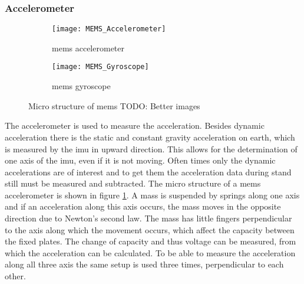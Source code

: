 \subsubsection{ Accelerometer}
\begin{figure}[htb]
	\centering
	\begin{subfigure}{0.48\textwidth}
		\centering
		\texttt{[image: MEMS\_Accelerometer]}
		\caption{\acrshort{mems} accelerometer}
		\label{fig:MEMS_Accelerometer}
	\end{subfigure}
	\begin{subfigure}{0.48\textwidth}
		\centering
		\texttt{[image: MEMS\_Gyroscope]}
		\caption{\acrshort{mems} gyroscope}
		\label{fig:MEMS_Gyroscope}
	\end{subfigure}
	\caption{Micro structure of \acrshort{mems} TODO: Better images}
	\label{fig:MEMS_design}
\end{figure}
The accelerometer is used to measure the acceleration.
Besides dynamic acceleration there is the static and constant gravity acceleration on earth, which is measured by the \gls{imu} in upward direction.
This allows for the determination of one axis of the \gls{imu}, even if it is not moving.
Often times only the dynamic accelerations are of interest and to get them the acceleration data during stand still must be measured and subtracted.
The micro structure of a \gls{mems} accelerometer is shown in figure \ref{fig:MEMS_Accelerometer}.
A mass is suspended by springs along one axis and if an acceleration along this axis occurs, the mass moves in the opposite direction due to Newton's second law.
The mass has little fingers perpendicular to the axis along which the movement occurs, which affect the capacity between the fixed plates.
The change of capacity and thus voltage can be measured, from which the acceleration can be calculated.
To be able to measure the acceleration along all three axis the same setup is used three times, perpendicular to each other.

